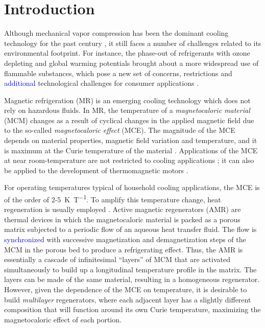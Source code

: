 \documentclass[referee]{svjour3}
\begin{document}
\printnomenclature

\section{Introduction}
\label{sec:introduction}

Although mechanical vapor compression has been the dominant cooling technology for the past century \cite{bib:nik}, it still faces a number of challenges related to its environmental footprint. For instance, the phase-out of refrigerants with ozone depleting and global warming potentials brought about a more widespread use of flammable substances, which pose a new set of concerns, restrictions and \textcolor{blue}{additional} technological challenges for consumer applications \cite{bib:iir-flammable, bib:lionte18-adapt}.

Magnetic refrigeration (MR) is an emerging cooling technology which does not rely on hazardous fluids. In MR, the temperature of a  \emph{magnetocaloric material} (MCM) changes as a result of cyclical changes in the applied magnetic field due to the so-called \emph{magnetocaloric effect} (MCE). The magnitude of the MCE depends on  material properties, magnetic field variation and temperature, and it is maximum at the Curie temperature of the material \cite{bib:smith-magneto, bib:kitanovski}. Applications of the MCE at near room-temperature are not restricted to cooling applications \cite{bib:gimaev19-review-htsc,bib:greco19}; it can also be applied to the development of thermomagnetic motors \cite{bib:kit2020rev, bib:kaneko19-desig}.   



For operating temperatures typical of household cooling applications, the MCE is of the order of \num{2}-\SI{5}{\kelvin\per\tesla}. To amplify this temperature change, heat regeneration is usually employed \cite{bib:kitanovski}. Active magnetic regenerators (AMR) are thermal devices in which the magnetocaloric material is packed as a porous matrix subjected to a  periodic flow of an aqueous heat transfer fluid. The flow is \textcolor{blue}{synchronized} with successive magnetization and demagnetization steps of the MCM in the porous bed to produce a refrigerating effect. Thus, the AMR is essentially a cascade of infinitesimal ``layers'' of MCM that are activated simultaneously to build up a longitudinal temperature profile in the matrix. The layers can be made of the same material, resulting in a homogeneous regenerator. However, given the dependence of the MCE on temperature, it is desirable to build \emph{multilayer} regenerators, where each adjacent layer has a slightly different composition that will function around its own Curie temperature, maximizing the magnetocaloric effect of each portion.
\end{document}
